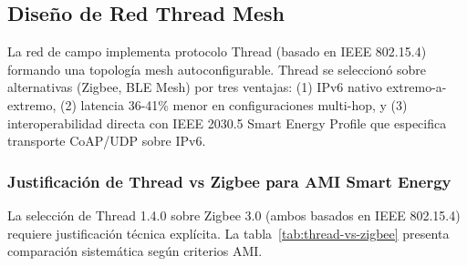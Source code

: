 \subsection{Diseño de Red Thread Mesh}

La red de campo implementa protocolo Thread (basado en IEEE 802.15.4) formando una topología mesh autoconfigurable. Thread se seleccionó sobre alternativas (Zigbee, BLE Mesh) por tres ventajas: (1) IPv6 nativo extremo-a-extremo, (2) latencia 36-41\% menor en configuraciones multi-hop, y (3) interoperabilidad directa con IEEE 2030.5 Smart Energy Profile que especifica transporte CoAP/UDP sobre IPv6.

\subsubsection{Justificación de Thread vs Zigbee para AMI Smart Energy}

La selección de Thread 1.4.0 sobre Zigbee 3.0 (ambos basados en IEEE 802.15.4) requiere justificación técnica explícita. La tabla~\ref{tab:thread-vs-zigbee} presenta comparación sistemática según criterios AMI.

